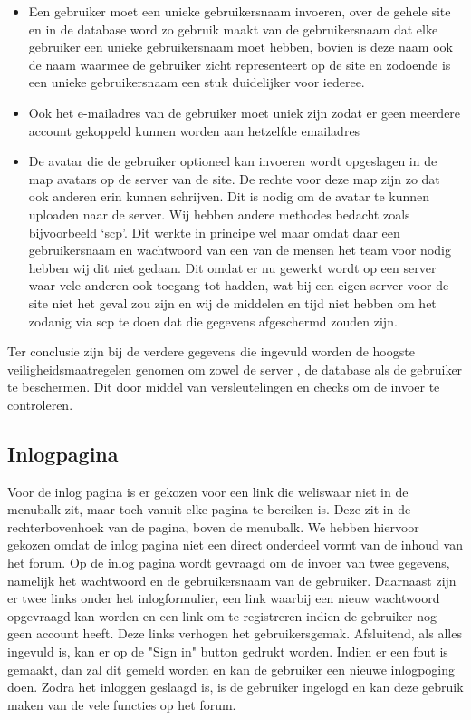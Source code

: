 \documentclass[a4paper,12pt]{article}
\begin{document}
\begin{itemize}
\item Een gebruiker moet een unieke gebruikersnaam invoeren, over de gehele site en in de database word zo gebruik maakt van de gebruikersnaam dat elke gebruiker een unieke gebruikersnaam moet hebben, bovien is deze naam ook de naam waarmee de gebruiker zicht representeert op de site en zodoende is een unieke gebruikersnaam een stuk duidelijker voor iederee.
\item Ook het e-mailadres van de gebruiker moet uniek zijn zodat er geen meerdere account gekoppeld kunnen worden aan hetzelfde emailadres 
\item De avatar die de gebruiker optioneel kan invoeren wordt opgeslagen in de map avatars op de server van de site. De rechte voor deze map zijn zo dat ook anderen erin kunnen schrijven. Dit is nodig om de avatar te kunnen uploaden naar de server. Wij hebben andere methodes bedacht zoals bijvoorbeeld ‘scp’. Dit werkte in principe wel maar omdat daar een gebruikersnaam en wachtwoord van een van de mensen het team voor nodig hebben wij dit niet gedaan. Dit omdat er nu gewerkt wordt op een server waar vele anderen ook toegang tot hadden, wat bij een eigen server voor de site niet het geval zou zijn en wij de middelen en tijd niet hebben om het zodanig via scp te doen dat die gegevens afgeschermd zouden zijn.
\end{itemize}

Ter conclusie zijn bij de verdere gegevens die ingevuld worden de hoogste veiligheidsmaatregelen genomen om zowel de server , de database als de gebruiker te beschermen. Dit door middel van versleutelingen en checks om de invoer te controleren.

\subsection[Inlogpagina]{Inlogpagina}
Voor de inlog pagina is er gekozen voor een link die weliswaar niet in de menubalk zit, maar toch vanuit elke pagina te bereiken is. Deze zit in de rechterbovenhoek van de pagina, boven de menubalk. We hebben hiervoor gekozen omdat de inlog pagina niet een direct onderdeel vormt van de inhoud van het forum.
Op de inlog pagina wordt gevraagd om de invoer van twee gegevens, namelijk het wachtwoord en de gebruikersnaam van de gebruiker. Daarnaast zijn er twee links onder het inlogformulier, een link waarbij een nieuw wachtwoord opgevraagd kan worden en een link om te registreren indien de gebruiker nog geen account heeft. Deze links verhogen het gebruikersgemak.
Afsluitend, als alles ingevuld is, kan er op de "Sign in" button gedrukt worden. Indien er een fout is gemaakt, dan zal dit gemeld worden en kan de gebruiker een nieuwe inlogpoging doen. Zodra het inloggen geslaagd is, is de gebruiker ingelogd en kan deze gebruik maken van de vele functies op het forum.\\
\end{document}
